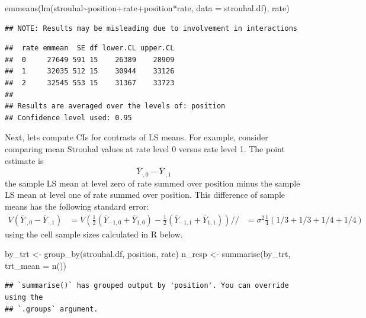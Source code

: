 \documentclass[
]{book}
\newenvironment{Shaded}{\begin{snugshade}}{\end{snugshade}}
\newcommand{\AttributeTok}[1]{\textcolor[rgb]{0.77,0.63,0.00}{#1}}
\newcommand{\FunctionTok}[1]{\textcolor[rgb]{0.00,0.00,0.00}{#1}}
\newcommand{\NormalTok}[1]{#1}
\newcommand{\OtherTok}[1]{\textcolor[rgb]{0.56,0.35,0.01}{#1}}
\newcommand{\SpecialCharTok}[1]{\textcolor[rgb]{0.00,0.00,0.00}{#1}}
\newcommand{\StringTok}[1]{\textcolor[rgb]{0.31,0.60,0.02}{#1}}
\begin{document}
\begin{Shaded}
\begin{Highlighting}[]
\FunctionTok{emmeans}\NormalTok{(}\FunctionTok{lm}\NormalTok{(strouhal}\SpecialCharTok{\textasciitilde{}}\NormalTok{position}\SpecialCharTok{+}\NormalTok{rate}\SpecialCharTok{+}\NormalTok{position}\SpecialCharTok{*}\NormalTok{rate, }\AttributeTok{data =}\NormalTok{ strouhal.df), }\StringTok{\textquotesingle{}rate\textquotesingle{}}\NormalTok{)}
\end{Highlighting}
\end{Shaded}

\begin{verbatim}
## NOTE: Results may be misleading due to involvement in interactions
\end{verbatim}

\begin{verbatim}
##  rate emmean  SE df lower.CL upper.CL
##  0     27649 591 15    26389    28909
##  1     32035 512 15    30944    33126
##  2     32545 553 15    31367    33723
## 
## Results are averaged over the levels of: position 
## Confidence level used: 0.95
\end{verbatim}

Next, lets compute CIs for contrasts of LS means. For example, consider comparing mean Strouhal values at rate level 0 versus rate level 1. The point estimate is
\[\overline Y_{\cdot,0} - \overline Y_{\cdot,1}\]
the sample LS mean at level zero of rate summed over position minus the sample LS mean at level one of rate summed over position. This difference of sample means has the following standard error:
\begin{align*}
V(\overline Y_{\cdot,0} - \overline Y_{\cdot,1}) & = V(\tfrac12(\overline Y_{-1,0} + \overline Y_{1,0}) -\tfrac12(\overline Y_{-1,1} + \overline Y_{1,1}))//
& = \sigma^2\tfrac14 (1/3 + 1/3 + 1/4 + 1/4)
\end{align*}
using the cell sample sizes calculated in R below.

\begin{Shaded}
\begin{Highlighting}[]
\NormalTok{by\_trt }\OtherTok{\textless{}{-}} \FunctionTok{group\_by}\NormalTok{(strouhal.df, position, rate)}
\NormalTok{n\_resp }\OtherTok{\textless{}{-}} \FunctionTok{summarise}\NormalTok{(by\_trt, }\AttributeTok{trt\_mean =} \FunctionTok{n}\NormalTok{())}
\end{Highlighting}
\end{Shaded}

\begin{verbatim}
## `summarise()` has grouped output by 'position'. You can override using the
## `.groups` argument.
\end{verbatim}
\end{document}
